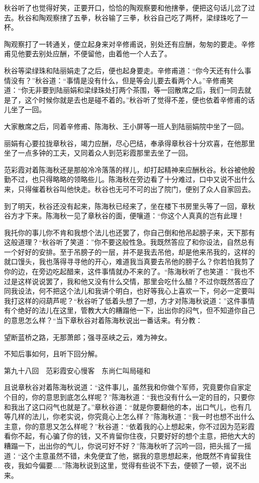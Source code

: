 \documentclass[12pt,UTF8]{ctexbook}
\begin{document}
{{{秋谷听了也觉得好笑，正要开口，恰恰的陶观察要和他搳拳，便把这句话儿岔了过去。秋谷和陶观察搳了五拳，秋谷输了三拳，秋谷自己吃了两杯，梁绿珠吃了一杯。

陶观察打了一转通关，便立起身来对辛修甫说，别处还有应酬，匆匆的要走。辛修甫见他要去别处应酬，不便留他，由着他一个人去了。

秋谷等梁绿珠和陆丽娟走了之后，便也起身要走。辛修甫道：“你今天还有什么事情没有？”秋谷道：“事情是没有什么，但是等会儿要去看两个人。”辛修甫笑道：“你无非要到陆丽娟和梁绿珠处打两个茶围，等一回散席之后，我们一同去就是了，这个时候你就是去也是碰不着的。”秋谷听了觉得不差，便也依着辛修甫的话儿坐了一回。

大家散席之后，同着辛修甫、陈海秋、王小屏等一班人到陆丽娟院中坐了一回。

丽娟有心要拉拢章秋谷，竭力应酬，尽心巴结，奉承得章秋谷十分欢喜，在他那里坐了一点多钟的工夫，又同着众人到范彩霞那里去坐了一回。

范彩霞对着陈海秋还是那般冷冷落落的样儿，却打起精神来应酬秋谷。秋谷被他殷勤不过，也只得略略的领略些儿。陈海秋在旁边看了十分难过，口中又说不出什么来，只得催着秋谷叫他快走。秋谷也无可不可的出了院门，便别了众人自家回去。

到了明天，秋谷还没有起来，陈海秋已经来了，坐在楼下书房里头等了一回，章秋谷方才下来。陈海秋一见了章秋谷的面，便嚷道：“你这个人真真的岂有此理！

我托你的事儿你不肯和我想个法儿也还罢了，你自己倒和他吊起膀子来，天下那有这般道理？“秋谷听了笑道：”你不要这般性急。我既然答应了和你设法，自然总有一个好好的安排。至于吊膀子的一层，并不是我去吊他，却是他来吊我的，这样的就口馒头，我也落得寻寻他的开心，难道我当真要去吊他的膀子么？你若怕我剪了你的边，在旁边吃起醋来，这件事情就办不来的了。“陈海秋听了也笑道：”我也不过是这样说说罢了，我和他又没有什么交情，那里会吃什么醋？不过你既然答应了同我设法，何不把这个法儿和我讲个明白，也好等我心上喜欢一下，何必一定要叫我打这样的闷葫芦呢？“秋谷听了低着头想了一想，方才对陈海秋说道：”这件事情有个绝好的法儿在这里，管教大大的糟蹋他一下，出出你的闷气，但不知道你自己的意思怎么样？“当下章秋谷对着陈海秋说出一番话来。有分教：

望断蓝桥之路，无那萧郎；强寻巫峡之云，难为神女。

不知后事如何，且听下回分解。





第九十八回　范彩霞安心慢客　东尚仁叫局碰和





且说章秋谷对着陈海秋说道：“这件事儿，虽然我和你做个军师，究竟要你自家定个目的，你的意思到底怎么样呢？”陈海秋道：“我也没有什么一定的目的，只要你和我出了这口闷气也就是了。”章秋谷道：“就是你要翻他的本，出口气儿，也有几等几样的法儿，你老实说，你究竟心上怎么样？”陈海秋道：“我一时也想不出什么主意，你的意思又怎么样呢？”秋谷道：“依着我的心上想起来，你不过因为范彩霞看你不起，有心骗了你的钱，又不肯留你住夜，只要好好的想个主意，把他大大的糟蹋一下，出出你的气儿，你说可好不好？”陈海秋听了沉吟一回，把头摇了一摇道：“这个主意虽然不错，未免便宜了他，据我的意思想起来，他既然不肯留我住夜，我如今偏要……”陈海秋说到这里，觉得有些说不下去，便顿了一顿，说不出来。

}}}
\end{document}
